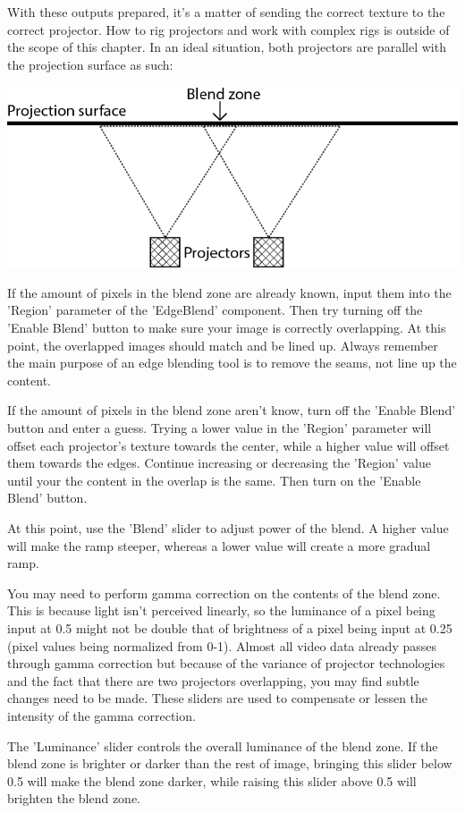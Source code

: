 \begin{fullwidth}
With these outputs prepared, it's a matter of sending the correct texture to the correct projector. How to rig projectors and work with complex rigs is outside of the scope of this chapter. In an ideal situation, both projectors are parallel with the projection surface as such:

\begin{center}
\includegraphics{./img/10.5/projectors.png}
\end{center}

If the amount of pixels in the blend zone are already known, input them into the 'Region' parameter of the 'EdgeBlend' component. Then try turning off the 'Enable Blend' button to make sure your image is correctly overlapping. At this point, the overlapped images should match and be lined up. Always remember the main purpose of an edge blending tool is to remove the seams, not line up the content.

If the amount of pixels in the blend zone aren't know, turn off the 'Enable Blend' button and enter a guess. Trying a lower value in the 'Region' parameter will offset each projector's texture towards the center, while a higher value will offset them towards the edges. Continue increasing or decreasing the 'Region' value until your the content in the overlap is the same. Then turn on the 'Enable Blend' button.

At this point, use the 'Blend' slider to adjust power of the blend. A higher value will make the ramp steeper, whereas a lower value will create a more gradual ramp.

You may need to perform gamma correction on the contents of the blend zone. This is because light isn't perceived linearly, so the luminance of a pixel being input at 0.5 might not be double that of brightness of a pixel being input at 0.25 (pixel values being normalized from 0-1). Almost all video data already passes through gamma correction but because of the variance of projector technologies and the fact that there are two projectors overlapping, you may find subtle changes need to be made. These sliders are used to compensate or lessen the intensity of the gamma correction.

The 'Luminance' slider controls the overall luminance of the blend zone. If the blend zone is brighter or darker than the rest of image, bringing this slider below 0.5 will make the blend zone darker, while raising this slider above 0.5 will brighten the blend zone.

\end{fullwidth}

